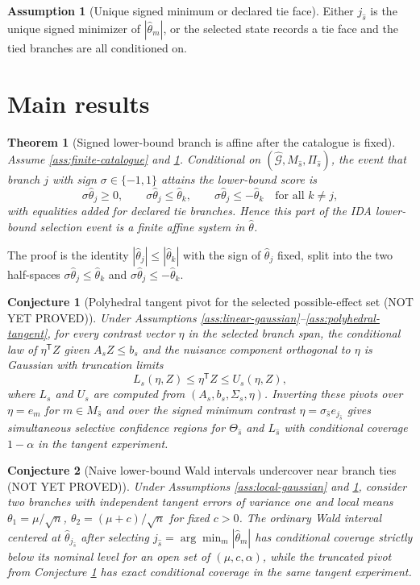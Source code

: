 \documentclass[11pt]{article}
\newcommand{\transpose}{\mathsf{T}}
\theoremstyle{definition}
\newtheorem{assumption}{Assumption}
\theoremstyle{plain}
\newtheorem{theorem}{Theorem}
\newtheorem{conjecture}{Conjecture}
\theoremstyle{remark}
\begin{document}
\begin{assumption}[Unique signed minimum or declared tie face]\label{ass:unique-min}
Either $j_{\widehat s}$ is the unique signed minimizer of $|\widehat\theta_m|$, or the selected state records a tie face and the tied branches are all conditioned on.
\end{assumption}

\section{Main results}
\begin{theorem}[Signed lower-bound branch is affine after the catalogue is fixed]\label{thm:min-poly}
Assume \ref{ass:finite-catalogue} and \ref{ass:unique-min}. Conditional on $(\widehat{\mathcal G},M_{\widehat s},\Pi_{\widehat s})$, the event that branch $j$ with sign $\sigma\in\{-1,1\}$ attains the lower-bound score is
\[
\sigma \widehat\theta_j\ge 0,\qquad
\sigma \widehat\theta_j\le \widehat\theta_k,\qquad
\sigma \widehat\theta_j\le -\widehat\theta_k\quad\text{for all }k\ne j,
\]
with equalities added for declared tie branches. Hence this part of the IDA lower-bound selection event is a finite affine system in $\widehat\theta$.
\end{theorem}
The proof is the identity $|\widehat\theta_j|\le|\widehat\theta_k|$ with the sign of $\widehat\theta_j$ fixed, split into the two half-spaces $\sigma\widehat\theta_j\le \widehat\theta_k$ and $\sigma\widehat\theta_j\le-\widehat\theta_k$.

\begin{conjecture}[Polyhedral tangent pivot for the selected possible-effect set (NOT YET PROVED)]\label{conj:set-pivot}
Under Assumptions \ref{ass:linear-gaussian}--\ref{ass:polyhedral-tangent}, for every contrast vector $\eta$ in the selected branch span, the conditional law of $\eta^\transpose Z$ given $A_sZ\le b_s$ and the nuisance component orthogonal to $\eta$ is Gaussian with truncation limits
\[
L_s(\eta,Z)\le \eta^\transpose Z\le U_s(\eta,Z),
\]
where $L_s$ and $U_s$ are computed from $(A_s,b_s,\Sigma_s,\eta)$. Inverting these pivots over $\eta=e_m$ for $m\in M_{\widehat s}$ and over the signed minimum contrast $\eta=\sigma_{\widehat s}e_{j_{\widehat s}}$ gives simultaneous selective confidence regions for $\Theta_{\widehat s}$ and $L_{\widehat s}$ with conditional coverage $1-\alpha$ in the tangent experiment.
\end{conjecture}

\begin{conjecture}[Naive lower-bound Wald intervals undercover near branch ties (NOT YET PROVED)]\label{conj:wald-fail}
Under Assumptions \ref{ass:local-gaussian} and \ref{ass:unique-min}, consider two branches with independent tangent errors of variance one and local means $\theta_1=\mu/\sqrt n$, $\theta_2=(\mu+c)/\sqrt n$ for fixed $c>0$. The ordinary Wald interval centered at $\widehat\theta_{j_{\widehat s}}$ after selecting $j_{\widehat s}=\arg\min_m|\widehat\theta_m|$ has conditional coverage strictly below its nominal level for an open set of $(\mu,c,\alpha)$, while the truncated pivot from Conjecture \ref{conj:set-pivot} has exact conditional coverage in the same tangent experiment.
\end{conjecture}
\end{document}
